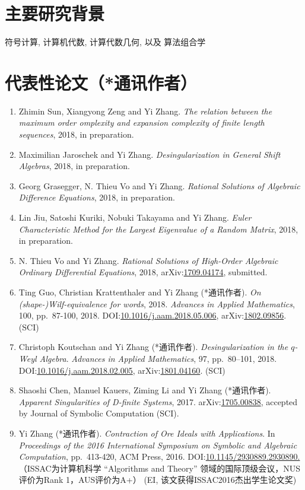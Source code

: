 \documentclass[a4paper,12pt]{article}
\newcommand{\red}{\color{red}}
\begin{document}
\begin{CJK*}{UTF8}{gbsn}
\section*{\Large{主要研究背景}}
符号计算, 计算机代数, 计算代数几何, 以及 算法组合学

\section*{\Large{代表性论文（*通讯作者）}}
\begin{enumerate}
\item Zhimin Sun,  Xiangyong Zeng and Yi Zhang. 
{\em The relation between the maximum order
omplexity and expansion complexity of finite length sequences}, 2018, in preparation.
\item Maximilian Jaroschek and Yi Zhang. 
{\em Desingularization in General Shift Algebras}, 2018, in preparation.
\item Georg Grasegger, N. Thieu Vo and Yi Zhang. 
{\em Rational Solutions of Algebraic Difference Equations}, 2018, in preparation.
\item Lin Jiu, Satoshi Kuriki, Nobuki Takayama and Yi Zhang. 
 {\em Euler Characteristic Method for the Largest Eigenvalue of a Random Matrix}, 2018, in preparation.
  \item N. Thieu Vo and Yi Zhang. {\em Rational Solutions of High-Order Algebraic Ordinary Differential Equations}, 2018, 
  arXiv:\href{https://arxiv.org/abs/1709.04174}{1709.04174}, submitted.
\item Ting Guo, Christian Krattenthaler and Yi Zhang (*通讯作者).
{\em On (shape-)Wilf-equivalence for words}, 2018.
{\em  Advances in Applied Mathematics}, 100, pp.\ 87-100, 2018. 
DOI:\href{https://doi.org/10.1016/j.aam.2018.05.006}{10.1016/j.aam.2018.05.006}, 
arXiv:\href{https://arxiv.org/pdf/1802.09856.pdf}{1802.09856}. (SCI)
\item Christoph Koutschan and Yi Zhang (*通讯作者). {\em Desingularization in the $q$-Weyl Algebra}. 
{\em Advances in Applied Mathematics}, 97, pp.\ 80–101, 2018. \\
DOI:\href{http://dx.doi.org/10.1016/j.aam.2018.02.005}{10.1016/j.aam.2018.02.005},
arXiv:\href{https://arxiv.org/abs/1801.04160}{1801.04160}. (SCI) 
\item Shaoshi Chen, Manuel Kauers, Ziming Li and Yi Zhang (*通讯作者). {\em Apparent Singularities of D-finite Systems}, 2017. 
 arXiv:\href{http://arxiv.org/abs/1705.00838}{1705.00838}, accepted by Journal of Symbolic Computation (SCI).
\item Yi Zhang (*通讯作者). {\em Contraction of Ore Ideals with Applications}. 
In {\em Proceedings of the 2016 International Symposium on Symbolic and Algebraic Computation}, 
pp.\ 413-420, ACM Press, 2016. DOI:\href{http://dl.acm.org/citation.cfm?id=2930890}{10.1145/2930889.2930890.} 
{\red （ISSAC为计算机科学 
“Algorithms and Theory”
领域的国际顶级会议，NUS评价为Rank 1，AUS评价为A+） (EI, 该文获得ISSAC2016杰出学生论文奖)} 
\end{enumerate}


\end{CJK*}
\end{document}
